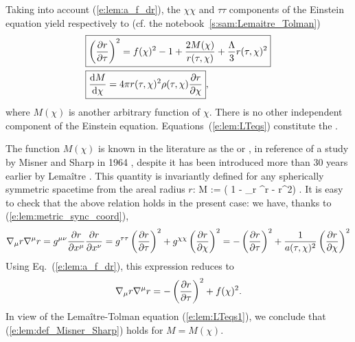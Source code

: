 Taking into account (\ref{e:lem:a_f_dr}), the $\chi\chi$ and $\tau\tau$ components of the Einstein equation
yield respectively to (cf. the notebook~\ref{s:sam:Lemaitre_Tolman})
\begin{subequations}\label{e:lem:LTeqs}
\begin{align}
 & \fbox{$\displaystyle \left( \frac{\partial r}{\partial \tau} \right) ^2 = f(\chi)^2 - 1 + \frac{2M(\chi)}{r(\tau,\chi)}
   + \frac{\Lambda}{3} r(\tau,\chi)^2 $} \label{e:lem:LTeqs1} \\
 & \fbox{$\displaystyle \frac{\mathrm{d} M}{\mathrm{d}\chi} = 4\pi r(\tau,\chi)^2 \rho(\tau,\chi) \frac{\partial r}{\partial \chi} $} ,
    \label{e:lem:LTeqs2}
 \end{align}
\end{subequations}
where $M(\chi)$ is another arbitrary function of $\chi$.
There is no other independent component of the Einstein equation.
Equations~(\ref{e:lem:LTeqs}) constitute the
.

The function $M(\chi)$ is known in the literature as the  or , in reference
of a study by Misner and Sharp in 1964 \cite{MisneS64}, despite it has been introduced
more than 30 years earlier by Lemaître \cite{Lemai32}. This quantity is
invariantly defined for any spherically symmetric spacetime from the areal radius $r$:
\be \label{e:lem:def_Misner_Sharp}
    M  :=  \left( 1 - \nabla_\mu r \nabla^\mu r  -  r^2\right) .
\ee
It is easy to check that the above relation holds in the present case:
we have, thanks to (\ref{e:lem:metric_sync_coord}),
\[
    \nabla_\mu r \nabla^\mu r = g^{\mu\nu} \frac{\partial r}{\partial x^\mu} \frac{\partial r}{\partial x^\nu}
        = g^{\tau\tau} \left( \frac{\partial r}{\partial \tau} \right)^2
        + g^{\chi\chi} \left( \frac{\partial r}{\partial \chi} \right)^2
        = - \left( \frac{\partial r}{\partial \tau} \right)^2 + \frac{1}{a(\tau,\chi)^2} \left( \frac{\partial r}{\partial \chi} \right)^2
\]
Using Eq.~(\ref{e:lem:a_f_dr}), this expression reduces to
\[
    \nabla_\mu r \nabla^\mu r = - \left( \frac{\partial r}{\partial \tau} \right)^2 + f(\chi)^2 .
\]
In view of the Lemaître-Tolman equation (\ref{e:lem:LTeqs1}), we conclude that
(\ref{e:lem:def_Misner_Sharp}) holds for $M = M(\chi)$.


